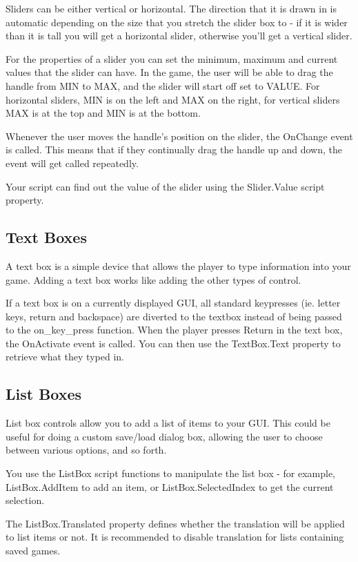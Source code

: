 Sliders can be either vertical or horizontal. The direction that it is drawn
in is automatic depending on the size that you stretch the slider box to - if
it is wider than it is tall you will get a horizontal slider, otherwise you'll
get a vertical slider.

For the properties of a slider you can set the minimum, maximum and current
values that the slider can have. In the game, the user will be able to drag
the handle from MIN to MAX, and the slider will start off set to VALUE.
For horizontal sliders, MIN is on the left and MAX on the right, for vertical
sliders MAX is at the top and MIN is at the bottom.

Whenever the user moves the handle's position on the slider, the OnChange event is
called. This means that if they continually drag the handle up and down,
the event will get called repeatedly.

Your script can find out the value of the slider using the Slider.Value script property.

\subsection{Text Boxes}%

A text box is a simple device that allows the player to type information into
your game. Adding a text box works like adding the other types of control.

If a text box is on a currently displayed GUI, all standard keypresses (ie.
letter keys, return and backspace) are diverted to the textbox instead of
being passed to the on_key_press function. When the player presses Return in
the text box, the OnActivate event is called. You can then use the TextBox.Text
property to retrieve what they typed in.

\subsection{List Boxes}%

List box controls allow you to add a list of items to your GUI. This could
be useful for doing a custom save/load dialog box, allowing the user to
choose between various options, and so forth.

You use the ListBox script functions to manipulate the list box - for
example, ListBox.AddItem to add an item, or ListBox.SelectedIndex to get the current
selection.

The ListBox.Translated property defines whether the translation will be applied to list items or not. It is recommended to disable translation for lists containing saved games.

